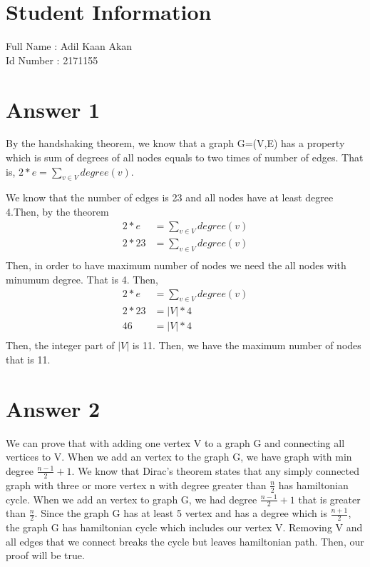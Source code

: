 \documentclass[11pt]{article}
\begin{document}
	
\section*{Student Information } 
Full Name :  Adil Kaan Akan \\
Id Number :  2171155\\

\section*{Answer 1}
By the  handshaking theorem, we know that a graph G=(V,E) has a property which is sum of degrees of all nodes equals to two times of number of edges. That is, $2*e = \sum\limits_{v \in V}{degree(v)}$.

We know that the number of edges is 23 and all nodes have at least degree 4.Then, by the theorem \\
	
\begin{align*}	
	2*e &= \sum\limits_{v \in V}{degree(v)} \\
	2*23 &= \sum\limits_{v \in V}{degree(v)} \\
\end{align*}
Then, in order to have maximum number of nodes we need the all nodes with minumum degree. That is 4. Then, \\

\begin{align*}	
	2*e &= \sum\limits_{v \in V}{degree(v)} \\
	2*23 &= |V|*4 \\
	46 &= |V|*4 \\
\end{align*}
Then, the integer part of $|V|$ is 11. Then, we have the maximum number of nodes that is 11. \\




\section*{Answer 2}
We can prove that with adding one vertex V  to a graph G and connecting all vertices to V. When we add an vertex to the graph G, we have graph with min degree $\frac{n-1}{2} + 1$. We know that Dirac's theorem states that any simply connected graph with three or more vertex n  with degree greater than $\frac{n}{2}$ has hamiltonian cycle. When we add an vertex to graph G, we had degree $\frac{n-1}{2} + 1$ that is greater than 
$\frac{n}{2}$. Since the graph G has at least 5 vertex and has a degree which is $\frac{n+1}{2}$, the graph G has hamiltonian cycle which includes our vertex V. Removing V and all edges that we connect breaks the cycle but leaves hamiltonian path. Then, our proof will be true.
\end{document}

